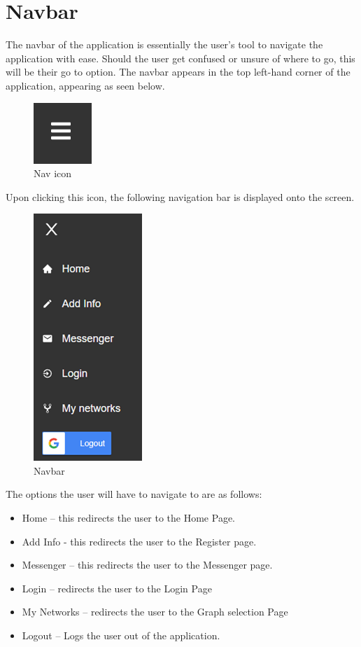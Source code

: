 \section{Navbar}
The navbar of the application is essentially the user’s tool to navigate the application with ease. Should the user get confused or unsure of where to go, this will be their go to option. The navbar appears in the top left-hand corner of the application, appearing as seen below. \\
\begin{figure}[H]
    \centering
    \includegraphics{img/nav1.png}
    \caption{Nav icon} 
    \label{fig:my_label}
\end{figure}
Upon clicking this icon, the following navigation bar is displayed onto the screen. \\
\begin{figure}[H]
    \centering
    \includegraphics{img/nav2.png}
    \caption{Navbar} 
    \label{fig:my_label}
\end{figure}

The options the user will have to navigate to are as follows: 
\begin{itemize}
\item Home – this redirects the user to the Home Page. 
\item Add Info - this redirects the user to the Register page.  
\item Messenger – this redirects the user to the Messenger page.  
\item Login – redirects the user to the Login Page
\item My Networks – redirects the user to the Graph selection Page 
\item Logout – Logs the user out of the application. 
\end{itemize}

